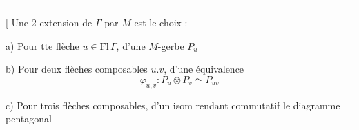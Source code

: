 \noindent\rule{.4\linewidth}{.4pt}

[ Une 2-extension de $\Gamma$ par $M$  est le choix :

a) Pour tte flèche $u\in\mathrm{Fl}\,\Gamma$, d'une $M$-gerbe $P_u$

b) Pour deux flèches composables $u.v$, d'une
équivalence
\[
\varphi_{u,v}:P_u\otimes P_v\simeq P_{uv}
\]

c) Pour trois flèches composables, d'un isom
rendant commutatif le diagramme
pentagonal
